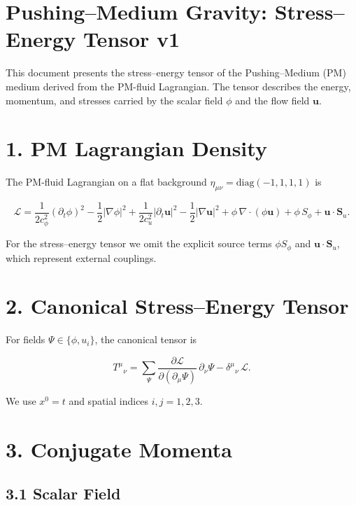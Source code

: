 \documentclass{article}
\begin{document}
\section*{Pushing--Medium Gravity: Stress--Energy Tensor v1}

This document presents the stress--energy tensor of the Pushing--Medium (PM)
medium derived from the PM-fluid Lagrangian. The tensor describes the energy,
momentum, and stresses carried by the scalar field $\phi$ and the flow field
$\mathbf u$.

\section*{1. PM Lagrangian Density}

The PM-fluid Lagrangian on a flat background $\eta_{\mu\nu} =
\mathrm{diag}(-1,1,1,1)$ is


\[
\mathcal{L}
=
\frac{1}{2c_\phi^2}(\partial_t \phi)^2
- \frac{1}{2}|\nabla \phi|^2
+
\frac{1}{2c_u^2}|\partial_t \mathbf u|^2
- \frac{1}{2}|\nabla \mathbf u|^2
+
\phi\,\nabla\cdot(\phi\mathbf u)
+
\phi\,S_\phi
+
\mathbf u\cdot\mathbf S_u.
\]



For the stress--energy tensor we omit the explicit source terms
$\phi S_\phi$ and $\mathbf u\cdot\mathbf S_u$, which represent external
couplings.

\section*{2. Canonical Stress--Energy Tensor}

For fields $\Psi \in \{\phi, u_i\}$, the canonical tensor is


\[
T^{\mu}{}_{\nu}
=
\sum_{\Psi}
\frac{\partial \mathcal{L}}{\partial(\partial_\mu \Psi)}\,
\partial_\nu \Psi
- \delta^{\mu}{}_{\nu}\,\mathcal{L}.
\]



We use $x^0 = t$ and spatial indices $i,j = 1,2,3$.

\section*{3. Conjugate Momenta}

\subsection*{3.1 Scalar Field}
\end{document}
